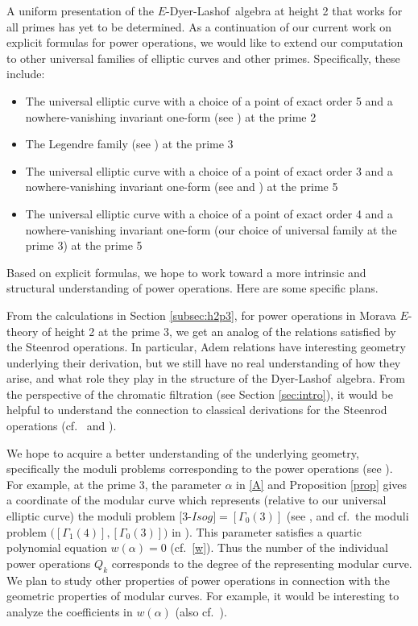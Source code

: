 \documentclass{rs}
\theoremstyle{definition}
\theoremstyle{remark}
\newcommand{\DL}{Dyer-Lashof~}
\newcommand{\A}{\alpha}
\newcommand{\G}{\Gamma}
\begin{document}
A uniform presentation of the $E$-\DL algebra at height 2 that works for all primes has yet to be determined.  
As a continuation of our current work on explicit formulas for power operations, 
we would like to extend our computation to other universal families of elliptic curves and other primes.  
Specifically, these include: 
\begin{itemize}
 \item The universal elliptic curve with a choice of a point of exact order 5 and a nowhere-vanishing invariant one-form (see \cite[Section 1.1]{behrensormsby}) at the prime 2 

 \item The Legendre family (see \cite[Section 1.3.2]{behrens}) at the prime 3 

 \item The universal elliptic curve with a choice of a point of exact order 3 and a nowhere-vanishing invariant one-form 
 (see \cite[Proposition 3.2]{tmf3} and \cite[Section 3]{h2p2}) at the prime 5 

 \item The universal elliptic curve with a choice of a point of exact order 4 and a nowhere-vanishing invariant one-form (our choice of universal family at the prime 3) at the prime 5 
\end{itemize}

Based on explicit formulas, we hope to work toward a more intrinsic and structural understanding of power operations.  
Here are some specific plans.  

From the calculations in Section \ref{subsec:h2p3}, for power operations in Morava $E$-theory of height 2 at the prime 3, 
we get an analog of the relations satisfied by the Steenrod operations.  
In particular, Adem relations have interesting geometry underlying their derivation, 
but we still have no real understanding of how they arise, and what role they play in the structure of the \DL algebra.  
From the perspective of the chromatic filtration (see Section \ref{sec:intro}), 
it would be helpful to understand the connection to classical derivations for the Steenrod operations 
(cf.~\cite[Section VIII.1]{steenrod} and \cite{bullettmacdonald}).  

We hope to acquire a better understanding of the underlying geometry, 
specifically the moduli problems corresponding to the power operations (see \cite[Theorem B]{cong}).  
For example, at the prime 3, the parameter $\A$ in \eqref{A} and Proposition \ref{prop} 
gives a coordinate of the modular curve which represents (relative to our universal elliptic curve) 
the moduli problem [3-$Isog] = [\G_0(3)]$ (see \cite[Sections 6.5 and 6.8]{KM}, and cf.~the moduli problem $\big([\G_1(4)],[\G_0(3)]\big)$ in \cite[10.9.6]{KM}).  
This parameter satisfies a quartic polynomial equation $w(\A) = 0$ (cf.~\eqref{w}).  
Thus the number of the individual power operations $Q_k$ corresponds to the degree of the representing modular curve.  
We plan to study other properties of power operations in connection with the geometric properties of modular curves.  
For example, it would be interesting to analyze the coefficients in $w(\A)$ (also cf.~\cite[Sections 10.13 and 12.9]{KM}).  
\end{document}
